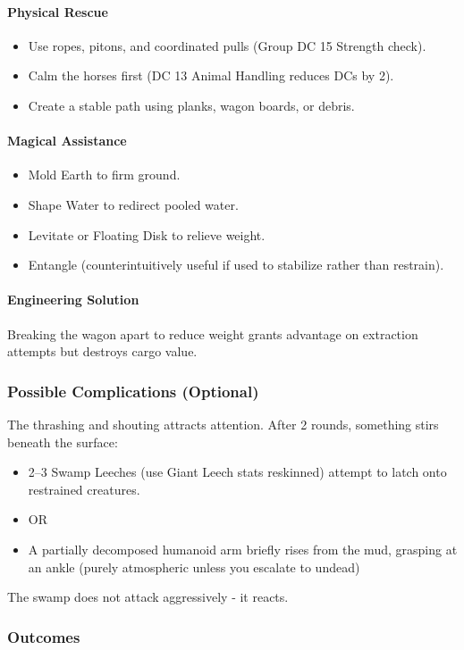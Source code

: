 \paragraph*{Physical Rescue}
\begin{itemize}
	\item Use ropes, pitons, and coordinated pulls (Group DC 15 Strength check).
	\item Calm the horses first (DC 13 Animal Handling reduces DCs by 2).
	\item Create a stable path using planks, wagon boards, or debris.
\end{itemize}
\paragraph*{Magical Assistance}
\begin{itemize}
	\item Mold Earth to firm ground.
	\item Shape Water to redirect pooled water.
	\item Levitate or Floating Disk to relieve weight.
	\item Entangle (counterintuitively useful if used to stabilize rather than restrain).
\end{itemize}
\paragraph*{Engineering Solution}
Breaking the wagon apart to reduce weight grants advantage on extraction attempts but destroys cargo value.

\subsubsection*{Possible Complications (Optional)}
The thrashing and shouting attracts attention. After 2 rounds, something stirs beneath the surface:
\begin{itemize}
	\item 2–3 Swamp Leeches (use Giant Leech stats reskinned) attempt to latch onto restrained creatures.
	\item OR
	\item A partially decomposed humanoid arm briefly rises from the mud, grasping at an ankle (purely atmospheric unless you escalate to undead)
\end{itemize}
The swamp does not attack aggressively - it reacts.

\subsubsection*{Outcomes}
